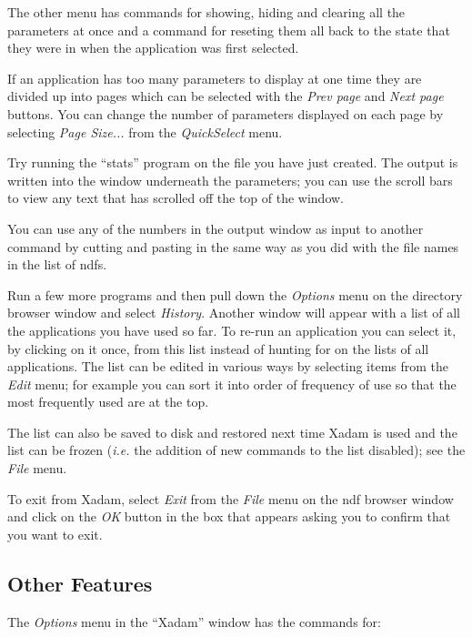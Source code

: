 \begin{list}{
}{\setlength{\rightmargin}{\leftmargin}}
The other menu has commands for showing, hiding and clearing all the
parameters at once and a command for reseting them all back to the
state that they were in when the application was first selected.

If an application has too many parameters to display at one time they
are divided up into pages which can be selected with the {\em Prev
page} and {\em Next page} buttons. You can change the number of
parameters displayed on each page by selecting {\em Page Size...} from
the {\em QuickSelect} menu.

\item Try running the ``stats'' program on the file you have just
created.  The output is written into the window underneath the
parameters; you can use the scroll bars to view any text that has
scrolled off the top of the window.

You can use any of the numbers in the output window as input to another
command by cutting and pasting in the same way as you did with the file
names in the list of ndfs.

\item Run a few more programs and then pull down the {\em Options} menu
on the directory browser window and select {\em History}. Another
window will appear with a list of all the applications you have used so
far. To re-run an application you can select it, by clicking on it
once, from this list instead of hunting for on the lists of all
applications. The list can be edited in various ways by selecting items
from the {\em Edit} menu; for example you can sort it into order of
frequency of use so that the most frequently used are at the top.

The list can also be saved to disk and restored next time Xadam is used
and the list can be frozen ({\em i.e.}\/ the addition of new commands to the
list disabled); see the {\em File} menu.

\end{list}

To exit from Xadam, select {\em Exit} from the {\em File} menu on the
ndf browser window and click on the {\em OK} button in the box that appears
asking you to confirm that you want to exit.


\subsection{Other Features}

The {\em Options} menu in the ``Xadam'' window has the commands for:

